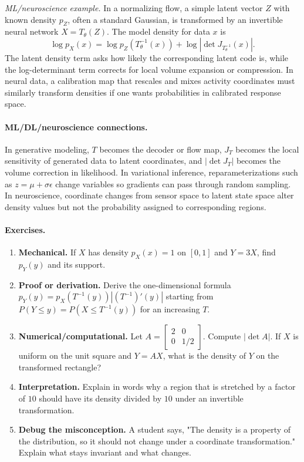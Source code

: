 \emph{ML/neuroscience example.} In a normalizing flow, a simple latent vector \(Z\) with known density \(p_Z\), often a standard Gaussian, is transformed by an invertible neural network \(X=T_\theta(Z)\). The model density for data \(x\) is
\[
\log p_X(x)
=
\log p_Z(T_\theta^{-1}(x))
+
\log\left|\det J_{T_\theta^{-1}}(x)\right|.
\]
The latent density term asks how likely the corresponding latent code is, while the log-determinant term corrects for local volume expansion or compression. In neural data, a calibration map that rescales and mixes activity coordinates must similarly transform densities if one wants probabilities in calibrated response space.

\paragraph{ML/DL/neuroscience connections.}
In generative modeling, \(T\) becomes the decoder or flow map, \(J_T\) becomes the local sensitivity of generated data to latent coordinates, and \(|\det J_T|\) becomes the volume correction in likelihood. In variational inference, reparameterizations such as \(z=\mu+\sigma\epsilon\) change variables so gradients can pass through random sampling. In neuroscience, coordinate changes from sensor space to latent state space alter density values but not the probability assigned to corresponding regions.

\paragraph{Exercises.}
\begin{enumerate}[label=\textbf{11.3.\arabic*.}, leftmargin=*]
\item \textbf{Mechanical.} If \(X\) has density \(p_X(x)=1\) on \([0,1]\) and \(Y=3X\), find \(p_Y(y)\) and its support.
\item \textbf{Proof or derivation.} Derive the one-dimensional formula \(p_Y(y)=p_X(T^{-1}(y))\left|(T^{-1})'(y)\right|\) starting from \(P(Y\leq y)=P(X\leq T^{-1}(y))\) for an increasing \(T\).
\item \textbf{Numerical/computational.} Let \(A=\begin{bmatrix}2&0\\0&1/2\end{bmatrix}\). Compute \(|\det A|\). If \(X\) is uniform on the unit square and \(Y=AX\), what is the density of \(Y\) on the transformed rectangle?
\item \textbf{Interpretation.} Explain in words why a region that is stretched by a factor of \(10\) should have its density divided by \(10\) under an invertible transformation.
\item \textbf{Debug the misconception.} A student says, "The density is a property of the distribution, so it should not change under a coordinate transformation." Explain what stays invariant and what changes.
\end{enumerate}

